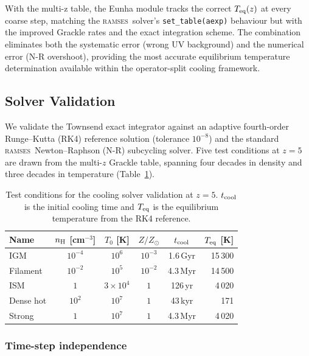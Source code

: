 \documentclass[fleqn,usenatbib]{mnras}
\newcommand{\ramses}{\textsc{ramses}}
\newcommand{\code}[1]{\texttt{#1}}
\begin{document}
With the multi-z table, the Eunha module tracks the correct
$T_{\rm eq}(z)$ at every coarse step, matching the \ramses\ solver's
\code{set\_table(aexp)} behaviour but with the improved Grackle rates
and the exact integration scheme.  The combination eliminates both
the systematic error (wrong UV background) and the numerical error
(N-R overshoot), providing the most accurate equilibrium temperature
determination available within the operator-split cooling framework.


\subsection{Solver Validation}
\label{sec:cool_validation}

We validate the Townsend exact integrator against an adaptive
fourth-order Runge--Kutta (RK4) reference solution (tolerance
$10^{-8}$) and the standard \ramses\ Newton--Raphson (N-R) subcycling
solver.  Five test conditions at $z = 5$ are drawn from the multi-$z$
Grackle table, spanning four decades in density and three decades in
temperature (Table~\ref{tab:cool_tests}).

\begin{table}
\centering
\caption{Test conditions for the cooling solver validation at $z=5$.
  $t_{\rm cool}$ is the initial cooling time and $T_{\rm eq}$ is the
  equilibrium temperature from the RK4 reference.}
\label{tab:cool_tests}
\begin{tabular}{lccccr}
\toprule
Name & $n_{\rm H}$ [cm$^{-3}$] & $T_0$ [K] & $Z/Z_\odot$ &
  $t_{\rm cool}$ & $T_{\rm eq}$ [K] \\
\midrule
IGM        & $10^{-4}$ & $10^{6}$      & $10^{-3}$ & 1.6\,Gyr  & 15\,300 \\
Filament   & $10^{-2}$ & $10^{5}$      & $10^{-2}$ & 4.3\,Myr  & 14\,500 \\
ISM        & $1$       & $3\times10^4$ & $1$        & 126\,yr   &  4\,020 \\
Dense hot  & $10^{2}$  & $10^{7}$      & $1$        & 43\,kyr   &    171  \\
Strong     & $1$       & $10^{7}$      & $1$        & 4.3\,Myr  &  4\,020 \\
\bottomrule
\end{tabular}
\end{table}

\subsubsection{Time-step independence}
\end{document}
